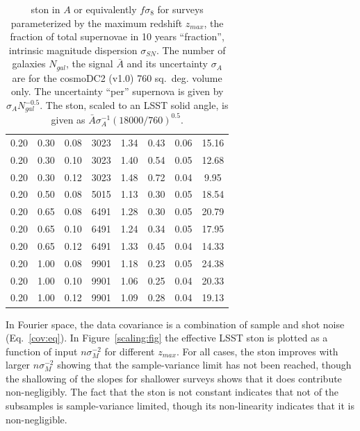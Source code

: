 \documentclass{aastex62}   	%
\begin{document}
\begin{table}
\begin{tabular}{|ccc|ccccc|}
0.20 & 0.30 & 0.08 & 3023 &   1.34 &   0.43 &   0.06 &  15.16 \\
0.20 & 0.30 & 0.10 & 3023 &   1.40 &   0.54 &   0.05 &  12.68 \\
0.20 & 0.30 & 0.12 & 3023 &   1.48 &   0.72 &   0.04 &   9.95 \\
0.20 & 0.50 & 0.08 & 5015 &   1.13 &   0.30 &   0.05 &  18.54 \\
0.20 & 0.65 & 0.08 & 6491 &   1.28 &   0.30 &   0.05 &  20.79 \\
0.20 & 0.65 & 0.10 & 6491 &   1.24 &   0.34 &   0.05 &  17.95 \\
0.20 & 0.65 & 0.12 & 6491 &   1.33 &   0.45 &   0.04 &  14.33 \\
0.20 & 1.00 & 0.08 & 9901 &   1.18 &   0.23 &   0.05 &  24.38 \\
0.20 & 1.00 & 0.10 & 9901 &   1.06 &   0.25 &   0.04 &  20.33 \\
0.20 & 1.00 & 0.12 & 9901 &   1.09 &   0.28 &   0.04 &  19.13 \\
    \hline
   \end{tabular}
   \caption{ston in $A$ or equivalently $f\sigma_8$ for surveys parameterized by the maximum redshift $z_{max}$,
   the fraction of total supernovae in 10 years ``fraction'', intrinsic magnitude dispersion $\sigma_{SN}$.  The number of galaxies
   $N_{gal}$, the signal $\bar{A}$ and its uncertainty $\sigma_A$ are for the cosmoDC2 (v1.0) 760 sq.~deg. volume only.
   The uncertainty ``per'' supernova is given by  $\sigma_A N_{gal}^{-0.5}$.  The ston, scaled to an LSST solid angle, is given as 
    $\bar{A} \sigma_A^{-1} (18000/760)^{0.5}$.
   \label{tab:subsets}}
\end{table}

In Fourier space, the data covariance is a combination of sample and shot noise (Eq.~\ref{cov:eq}).
In Figure~\ref{scaling:fig} the effective LSST ston is plotted as a function of input $n \sigma^{-2}_M$ for different $z_{max}$.
For all cases, the ston improves with larger $n \sigma^{-2}_M$ showing that the sample-variance limit has not been reached,
though the shallowing of the slopes for shallower surveys shows that it does contribute non-negligibly.
The fact that the ston is not constant indicates that not of the subsamples is sample-variance limited, though its non-linearity
indicates that it is non-negligible.
\end{document}
